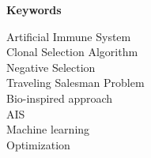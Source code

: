 %
%
% 
% 
% 

\begin{center}
{\Large\bfseries Keywords}
\end{center}

\noindent
Artificial Immune System\\
Clonal Selection Algorithm\\
Negative Selection\\
Traveling Salesman Problem\\
Bio-inspired approach\\
AIS\\
Machine learning\\
Optimization



